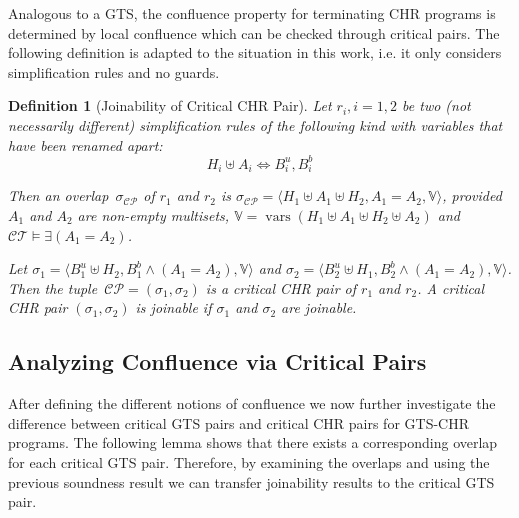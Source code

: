 \documentclass{tlp}
\newtheorem{definition}{Definition}[section]
\newcommand{\st}[3]{\ensuremath{\langle #1 , #2 , #3 \rangle}}
\newcommand{\CT}{\ensuremath{\mathcal{CT}}}
\newcommand{\mcCP}{\ensuremath{\mathcal{CP}}}
\newcommand{\bbV}{\ensuremath{\mathbb{V}}}
\newcommand{\sigcp}{\ensuremath{\sigma_{\mcCP}}}
\DeclareMathOperator{\vars}{vars}
\begin{document}
Analogous to a GTS, the confluence property for terminating CHR programs is
determined by local confluence which can be checked through critical pairs. The
following definition is adapted to the situation in this work, i.e. it only
considers simplification rules and no guards.

\begin{definition}[Joinability of Critical CHR Pair]\label{def:chr_cp} Let $r_i,
i =1,2$ be two (not necessarily different) simplification rules of the following
kind with variables that have been renamed apart: \[ H_i \uplus A_i
\Leftrightarrow B_i^u,B_i^b \]

Then an \emph{overlap}~$\sigcp$ of $r_1$ and $r_2$ is $\sigcp = \st{H_1 \uplus
A_1 \uplus H_2}{A_1 = A_2}{\bbV}$, provided $A_1$ and $A_2$ are non-empty
multisets, $\bbV = \vars(H_1 \uplus A_1 \uplus H_2 \uplus A_2)$ and $\CT \models
\exists (A_1 = A_2)$.

Let $\sigma_1 = \st{B_1^u \uplus H_2}{B_1^b \land (A_1 = A_2)}{\bbV}$ and
$\sigma_2 = \st{B_2^u \uplus H_1}{B_2^b \land (A_1 = A_2)}{\bbV}$. Then the
tuple~$\mcCP = (\sigma_1, \sigma_2)$ is a \emph{critical CHR pair} of $r_1$ and
$r_2$. A critical CHR pair $(\sigma_1, \sigma_2)$ is \emph{joinable} if
$\sigma_1$ and $\sigma_2$ are joinable.
\end{definition}

\subsection{Analyzing Confluence via Critical Pairs}
\label{sec:confl_pairs}

After defining the different notions of confluence we now further investigate the
difference between critical GTS pairs and critical CHR pairs for GTS-CHR
programs. The following lemma shows that there exists a corresponding overlap for
each critical GTS pair. Therefore, by examining the overlaps and using the
previous soundness result we can transfer joinability results to the critical GTS
pair.
\end{document}
